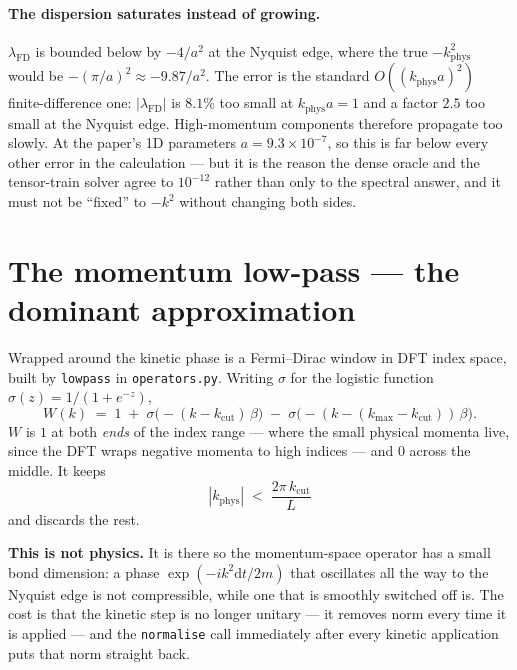 \documentclass[11pt,a4paper]{article}
\newcommand{\code}[1]{\texttt{#1}}
\newcommand{\kph}{k_{\mathrm{phys}}}
\newcommand{\lFD}{\lambda_{\mathrm{FD}}}
\newcommand{\kcut}{k_{\mathrm{cut}}}
\newcommand{\dd}{\mathrm{d}}
\begin{document}
\paragraph{The dispersion saturates instead of growing.}
$\lFD$ is bounded below by $-4/a^2$ at the Nyquist edge, where the true $-\kph^2$
would be $-(\pi/a)^2 \approx -9.87/a^2$. The error is the standard
$O\!\left((\kph a)^2\right)$ finite-difference one: $|\lFD|$ is $8.1\%$ too small at
$\kph a = 1$ and a factor $2.5$ too small at the Nyquist edge. High-momentum
components therefore propagate too slowly. At the paper's 1D parameters
$a = 9.3\times 10^{-7}$, so this is far below every other error in the calculation
--- but it is the reason the dense oracle and the tensor-train solver agree to
$10^{-12}$ rather than only to the spectral answer, and it must not be ``fixed'' to
$-k^2$ without changing both sides.

\section{The momentum low-pass --- the dominant approximation}
\label{sec:lowpass}

Wrapped around the kinetic phase is a Fermi--Dirac window in DFT index space,
built by \code{lowpass} in \code{operators.py}. Writing $\sigma$ for the logistic
function $\sigma(z) = 1/(1+e^{-z})$,
\begin{equation}
  W(k) \;=\; 1 \;+\; \sigma\big({-}(k - \kcut)\,\beta\big)
       \;-\; \sigma\big({-}(k - (k_{\max} - \kcut))\,\beta\big) .
  \label{eq:lowpass}
\end{equation}
$W$ is $1$ at both \emph{ends} of the index range --- where the small physical
momenta live, since the DFT wraps negative momenta to high indices --- and $0$ across
the middle. It keeps
\begin{equation}
  |\kph| \;<\; \frac{2\pi\,\kcut}{L}
  \label{eq:physcut}
\end{equation}
and discards the rest.

\textbf{This is not physics.} It is there so the momentum-space operator has a small
bond dimension: a phase $\exp(-i k^2 \dd t / 2m)$ that oscillates all the way to the
Nyquist edge is not compressible, while one that is smoothly switched off is. The
cost is that the kinetic step is no longer unitary --- it removes norm every time it
is applied --- and the \code{normalise} call immediately after every kinetic
application puts that norm straight back.
\end{document}
